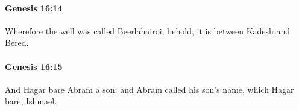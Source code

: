		\paragraph{Genesis 16:14} %
			\label{GENESIS-16-14}

			Wherefore the well was called Beerlahairoi; behold, it is between Kadesh and Bered.


		\paragraph{Genesis 16:15} %
			\label{GENESIS-16-15}

			And Hagar bare Abram a son: and Abram called his son's name, which Hagar bare, Ishmael.


